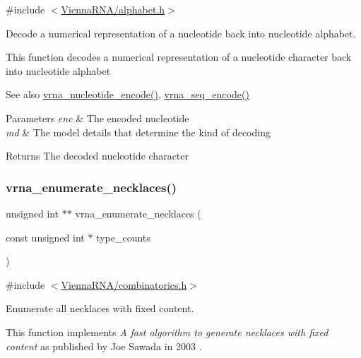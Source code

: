{\ttfamily \#include $<$\hyperlink{alphabet_8h}{Vienna\+R\+N\+A/alphabet.\+h}$>$}



Decode a numerical representation of a nucleotide back into nucleotide alphabet. 

This function decodes a numerical representation of a nucleotide character back into nucleotide alphabet

\begin{DoxySeeAlso}{See also}
\hyperlink{group__utils_gac12bf00123f88621c9be847b0879c1fb}{vrna\+\_\+nucleotide\+\_\+encode()}, \hyperlink{group__utils_ga636e7d6f888fd639587296a5eddea660}{vrna\+\_\+seq\+\_\+encode()}
\end{DoxySeeAlso}

\begin{DoxyParams}{Parameters}
{\em enc} & The encoded nucleotide \\
\hline
{\em md} & The model details that determine the kind of decoding \\
\hline
\end{DoxyParams}
\begin{DoxyReturn}{Returns}
The decoded nucleotide character 
\end{DoxyReturn}
\mbox{\label{group__utils_gae081ac655a76bd5c4b3d86c60b096b75}} 
\subsubsection{\texorpdfstring{vrna\+\_\+enumerate\+\_\+necklaces()}{vrna\_enumerate\_necklaces()}}
{\footnotesize\ttfamily unsigned int $\ast$$\ast$ vrna\+\_\+enumerate\+\_\+necklaces (\begin{DoxyParamCaption}\item[{const unsigned int $\ast$}]{type\+\_\+counts }\end{DoxyParamCaption})}



{\ttfamily \#include $<$\hyperlink{combinatorics_8h}{Vienna\+R\+N\+A/combinatorics.\+h}$>$}



Enumerate all necklaces with fixed content. 

This function implements {\itshape A fast algorithm to generate necklaces with fixed content} as published by Joe Sawada in 2003 \cite{sawada:2003}.


